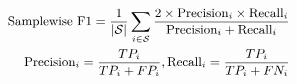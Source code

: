 \begin{equation}
    \small
    \begin{aligned}
        \text{Samplewise F1} = \frac{1}{|\mathcal{S}|} \sum_{i \in \mathcal{S}} 
        \frac{2 \times \text{Precision}_i \times \text{Recall}_i}
        {\text{Precision}_i + \text{Recall}_i} \\
        \text{Precision}_i = \frac{TP_{i}}{TP_{i} + FP_{i}}, \text{Recall}_i = \frac{TP_{i}}{TP_{i} + FN_{i}}
    \end{aligned}
    \nonumber
\end{equation}